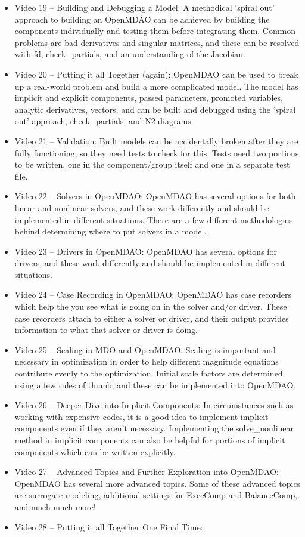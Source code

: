 \documentclass[12pt, letterpaper]{article}
\begin{document}
\begin{itemize}
	\item  Video 19 – Building and Debugging a Model: A methodical ‘spiral out’ approach to building an OpenMDAO can be achieved by building the components individually and testing them before integrating them. Common problems are bad derivatives and singular matrices, and these can be resolved with fd, check\_partials, and an understanding of the Jacobian.
	\item Video 20 – Putting it all Together (again): OpenMDAO can be used to break up a real-world problem and build a more complicated model. The model has implicit and explicit components, passed parameters, promoted variables, analytic derivatives, vectors, and can be built and debugged using the ‘spiral out’ approach, check\_partials, and N2 diagrams.
	\item Video 21 – Validation: Built models can be accidentally broken after they are fully functioning, so they need tests to check for this. Tests need two portions to be written, one in the component/group itself and one in a separate test file.
	\item Video 22 – Solvers in OpenMDAO: OpenMDAO has several options for both linear and nonlinear solvers, and these work differently and should be implemented in different situations. There are a few different methodologies behind determining where to put solvers in a model. 
	\item Video 23 – Drivers in OpenMDAO: OpenMDAO has several options for drivers, and these work differently and should be implemented in different situations.
	\item Video 24 – Case Recording in OpenMDAO: OpenMDAO has case recorders which help the you see what is going on in the solver and/or driver. These case recorders attach to either a solver or driver, and their output provides information to what that solver or driver is doing.
	\item Video 25 – Scaling in MDO and OpenMDAO: Scaling is important and necessary in optimization in order to help different magnitude equations contribute evenly to the optimization. Initial scale factors are determined using a few rules of thumb, and these can be implemented into OpenMDAO.
	\item Video 26 – Deeper Dive into Implicit Components: In circumstances such as working with expensive codes, it is a good idea to implement implicit components even if they aren’t necessary. Implementing the solve\_nonlinear method in implicit components can also be helpful for portions of implicit components which can be written explicitly.
	\item Video 27 – Advanced Topics and Further Exploration into OpenMDAO: OpenMDAO has several more advanced topics. Some of these advanced topics are surrogate modeling, additional settings for ExecComp and BalanceComp, and much much more!
	\item Video 28 – Putting it all Together One Final Time:
\end{itemize}
\end{document}
